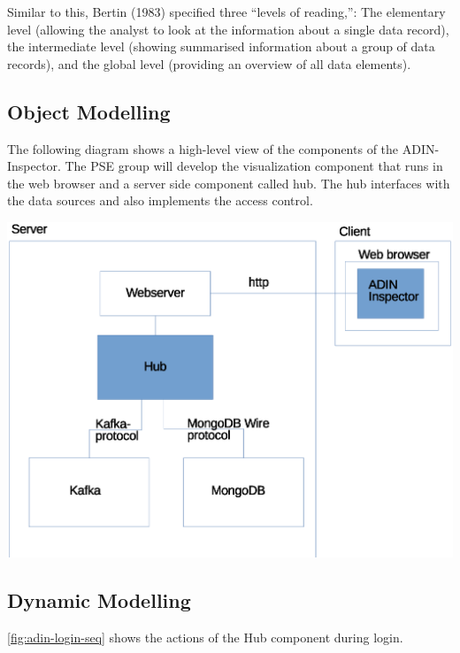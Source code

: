 \documentclass[twoside, english, draft]{Pflichtenheft}
\begin{document}
Similar to this, Bertin (1983) specified three “levels of reading,”:
The elementary level (allowing the analyst to look at the information about a
single data record), the intermediate level (showing summarised information about a group of data records), and the global level (providing an overview of all data elements).

\subsection{Object Modelling}

The following diagram shows a high-level view of the components of the ADIN-Inspector. The PSE group will develop the visualization component that runs in the web browser and a server side component called hub. The hub interfaces with the data sources and also implements the access control.

\begin{center}
	\includegraphics[scale=0.8]{Images/adin-sys1d.eps}
	\label{fig:adinsys1c}
\end{center}


\subsection{Dynamic Modelling}

\autoref{fig:adin-login-seq} shows the actions of the Hub component during login.
\end{document}
